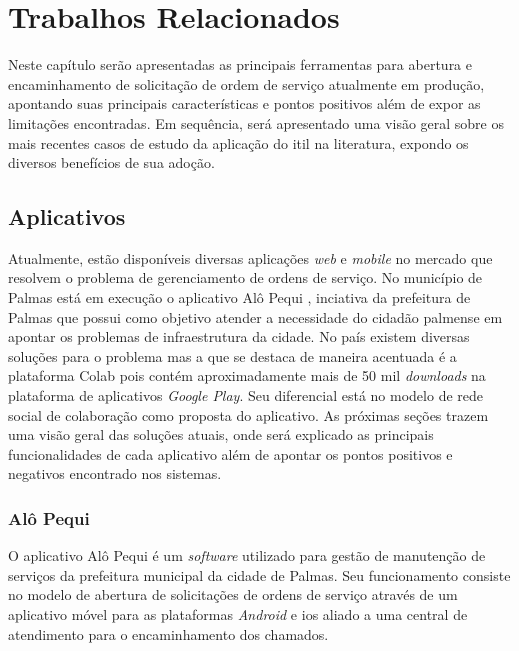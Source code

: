 \chapter{Trabalhos Relacionados}

\noindent Neste capítulo serão apresentadas as principais ferramentas para abertura e encaminhamento de solicitação de ordem de serviço atualmente em produção, apontando suas principais características e pontos positivos além de expor as limitações encontradas. Em sequência, será apresentado uma visão geral sobre os mais recentes casos de estudo da aplicação do \acrshort{itil} na literatura, expondo os diversos benefícios de sua adoção.

\section{Aplicativos}

\noindent Atualmente, estão disponíveis diversas aplicações \textit{web} e \textit{mobile} no mercado que resolvem o problema de gerenciamento de ordens de serviço. No município de Palmas está em execução o aplicativo Alô Pequi \cite{alo_pequi}, inciativa da prefeitura de Palmas que possui como objetivo atender a necessidade do cidadão palmense em apontar os problemas de infraestrutura da cidade. No país existem diversas soluções para o problema mas a que se destaca de maneira acentuada é a plataforma Colab \cite{colab} pois contém aproximadamente mais de 50 mil \textit{downloads} na plataforma de aplicativos \textit{Google Play}. Seu diferencial está no modelo de rede social de colaboração como proposta do aplicativo. As próximas seções trazem uma visão geral das soluções atuais, onde será explicado as principais funcionalidades de cada aplicativo além de apontar os pontos positivos e negativos encontrado nos sistemas.

\subsection{Alô Pequi}

\noindent O aplicativo Alô Pequi é um \textit{software} utilizado para gestão de manutenção de serviços da prefeitura municipal da cidade de Palmas. Seu funcionamento consiste no modelo de abertura de solicitações de ordens de serviço através de um aplicativo móvel para as plataformas \textit{Android} e \acrshort{ios} aliado a uma central de atendimento para o encaminhamento dos chamados.

